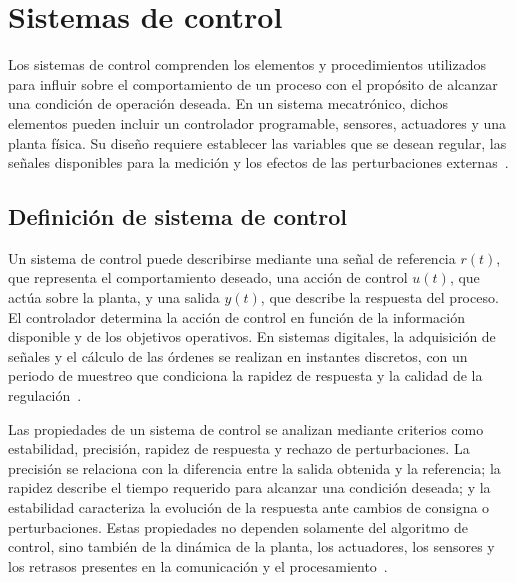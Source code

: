 
\section{Sistemas de control}
Los sistemas de control comprenden los elementos y procedimientos utilizados para influir sobre el comportamiento de un proceso con el propósito de alcanzar una condición de operación deseada. En un sistema mecatrónico, dichos elementos pueden incluir un controlador programable, sensores, actuadores y una planta física. Su diseño requiere establecer las variables que se desean regular, las señales disponibles para la medición y los efectos de las perturbaciones externas~\cite{nise2015control,astrom2020feedback}.

\subsection{Definición de sistema de control}
Un sistema de control puede describirse mediante una señal de referencia $r(t)$, que representa el comportamiento deseado, una acción de control $u(t)$, que actúa sobre la planta, y una salida $y(t)$, que describe la respuesta del proceso. El controlador determina la acción de control en función de la información disponible y de los objetivos operativos. En sistemas digitales, la adquisición de señales y el cálculo de las órdenes se realizan en instantes discretos, con un periodo de muestreo que condiciona la rapidez de respuesta y la calidad de la regulación~\cite{franklin2010feedback,nise2015control}.

Las propiedades de un sistema de control se analizan mediante criterios como estabilidad, precisión, rapidez de respuesta y rechazo de perturbaciones. La precisión se relaciona con la diferencia entre la salida obtenida y la referencia; la rapidez describe el tiempo requerido para alcanzar una condición deseada; y la estabilidad caracteriza la evolución de la respuesta ante cambios de consigna o perturbaciones. Estas propiedades no dependen solamente del algoritmo de control, sino también de la dinámica de la planta, los actuadores, los sensores y los retrasos presentes en la comunicación y el procesamiento~\cite{astrom2020feedback}.


